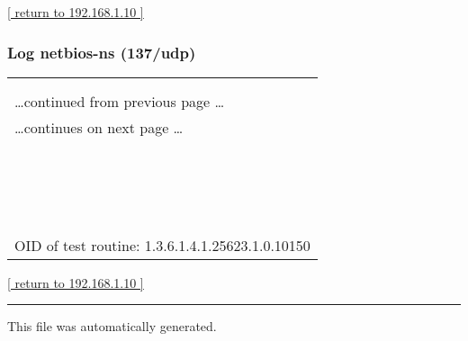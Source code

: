 \documentclass{article}
\begin{document}
\begin{footnotesize}\hyperref[host:192.168.1.10]{[ return to 192.168.1.10 ]}\end{footnotesize}
\subsubsection{Log netbios-ns (137/udp)}
\label{port:192.168.1.10 netbios-ns (137/udp) Log}

\begin{longtable}{|p{}|}
\hline
\rowcolor{openvas_log}{\color{white}{Log (CVSS: 0.0) }}\\
\rowcolor{openvas_log}{\color{white}{NVT: Using NetBIOS to retrieve information from a Windows host}}\\
\hline
\endfirsthead
\hfill\ldots continued from previous page \ldots \\
\hline
\endhead
\hline
\ldots continues on next page \ldots \\
\endfoot
\hline
\endlastfoot
\\
\rowcolor{white}{\verb=The following 5 NetBIOS names have been gathered :=}\\
\rowcolor{white}{\verb= ROME            =\verb-=-\verb= This is the computer name registered for workstation services=}\\
\rowcolor{white}{$\hookrightarrow$\verb= by a WINS client.=}\\
\rowcolor{white}{\verb= ROME            =\verb-=-\verb= This is the current logged in user registered for this workst=}\\
\rowcolor{white}{$\hookrightarrow$\verb=ation.=}\\
\rowcolor{white}{\verb= ROME            =\verb-=-\verb= Computer name=}\\
\rowcolor{white}{\verb= WORKGROUP       =\verb-=-\verb= Workgroup / Domain name (part of the Browser elections)=}\\
\rowcolor{white}{\verb= WORKGROUP       =\verb-=-\verb= Workgroup / Domain name=}\\
\rowcolor{white}{\verb=. This SMB server seems to be a SAMBA server (this is not a security=}\\
\rowcolor{white}{\verb=risk, this is for your information). This can be told because this server =}\\
\rowcolor{white}{\verb=claims to have a null MAC address=}\\
\rowcolor{white}{\verb=If you do not want to allow everyone to find the NetBios name=}\\
\rowcolor{white}{\verb=of your computer, you should filter incoming traffic to this port.=}\\
\rowcolor{white}{\verb==}\\
\rowcolor{white}{\verb==}\\
\\
OID of test routine: 1.3.6.1.4.1.25623.1.0.10150\\
\end{longtable}

\begin{footnotesize}\hyperref[host:192.168.1.10]{[ return to 192.168.1.10 ]}\end{footnotesize}

\begin{center}
\medskip
\rule{\textwidth}{0.1pt}

This file was automatically generated.
\end{center}
\end{document}
